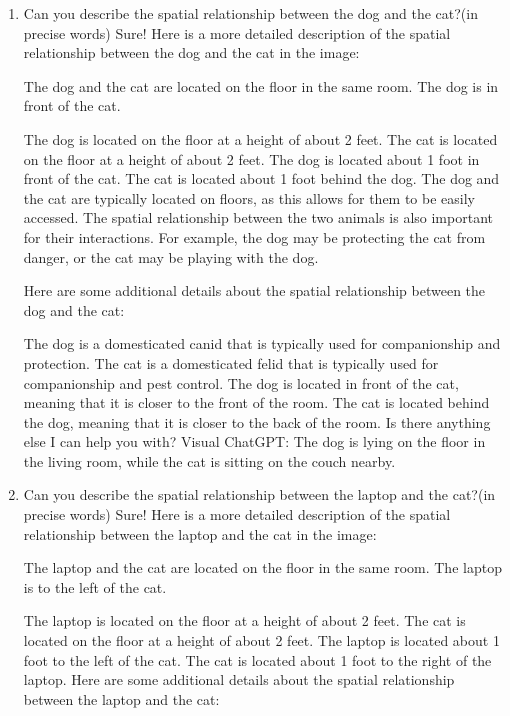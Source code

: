 \begin{enumerate}
    \item Can you describe the spatial relationship between the dog and the cat?(in precise words)
    \subitem Sure! Here is a more detailed description of the spatial relationship between the dog and the cat in the image:

    The dog and the cat are located on the floor in the same room. The dog is in front of the cat.
    
    The dog is located on the floor at a height of about 2 feet.
    The cat is located on the floor at a height of about 2 feet.
    The dog is located about 1 foot in front of the cat.
    The cat is located about 1 foot behind the dog.
    The dog and the cat are typically located on floors, as this allows for them to be easily accessed. The spatial relationship between the two animals is also important for their interactions. For example, the dog may be protecting the cat from danger, or the cat may be playing with the dog.
    
    Here are some additional details about the spatial relationship between the dog and the cat:
    
    The dog is a domesticated canid that is typically used for companionship and protection.
    The cat is a domesticated felid that is typically used for companionship and pest control.
    The dog is located in front of the cat, meaning that it is closer to the front of the room.
    The cat is located behind the dog, meaning that it is closer to the back of the room.
    Is there anything else I can help you with?
    \subitem Visual ChatGPT: The dog is lying on the floor in the living room, while the cat is sitting on the couch nearby.
    \item Can you describe the spatial relationship between the laptop and the cat?(in precise words)
    \subitem Sure! Here is a more detailed description of the spatial relationship between the laptop and the cat in the image:

    The laptop and the cat are located on the floor in the same room. The laptop is to the left of the cat.
    
    The laptop is located on the floor at a height of about 2 feet.
    The cat is located on the floor at a height of about 2 feet.
    The laptop is located about 1 foot to the left of the cat.
    The cat is located about 1 foot to the right of the laptop.
    Here are some additional details about the spatial relationship between the laptop and the cat:
    

\end{enumerate}
